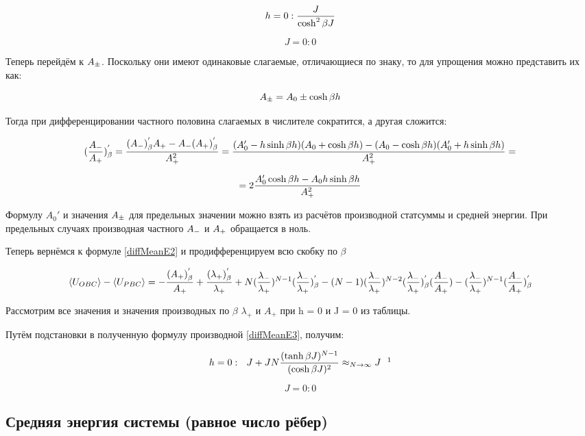 \[ h = 0: \frac{J}{\cosh^{2}\beta J} \]

\[ J = 0: 0 \]

Теперь перейдём к $A_{\pm}$. Поскольку они имеют одинаковые слагаемые, отличающиеся по знаку, то для упрощения можно представить их как:

\[ A_{\pm} = A_{0} \pm \cosh{\beta h} \]

Тогда при дифференцировании частного половина слагаемых в числителе сократится, а другая сложится:

\[ (\frac{A_{-}}{A_{+}})^{'}_{\beta} = \frac{(A_{-})^{'}_{\beta}A_{+}-A_{-}(A_{+})^{'}_{\beta}}{A_{+}^{2}} = \frac{(A_{0}' - h\sinh{\beta h})(A_{0} + \cosh{\beta h}) - (A_{0} - \cosh{\beta h})(A_{0}'+ h\sinh{\beta h})}{A_{+}^{2}} = \]

\[ = 2\frac{A_{0}'\cosh{\beta h} - A_{0}h\sinh{\beta h}}{A_{+}^{2}}\]

Формулу $A_{0}'$ и значения $A_{\pm}$ для предельных значении можно взять из расчётов производной статсуммы и средней энергии. При предельных случаях производная частного $A_{-}$ и $A_{+}$ обращается в ноль.

Теперь вернёмся к формуле \eqref{diffMeanE2} и продифференцируем всю скобку по $\beta$

\begin{equation}\label{diffMeanE3}
    \langle U_{OBC} \rangle - \langle U_{PBC} \rangle = -\frac{(A_{+})^{'}_{\beta}}{A_{+}} + \frac{(\lambda_{+})^{'}_{\beta}}{\lambda_{+}} + N(\frac{\lambda_{-}}{\lambda_{+}})^{N-1}(\frac{\lambda_{-}}{\lambda_{+}})^{'}_{\beta} - (N-1)(\frac{\lambda_{-}}{\lambda_{+}})^{N-2}(\frac{\lambda_{-}}{\lambda_{+}})^{'}_{\beta}(\frac{A_{-}}{A_{+}}) - (\frac{\lambda_{-}}{\lambda_{+}})^{N-1}(\frac{A_{-}}{A_{+}})^{'}_{\beta}
\end{equation}

Рассмотрим все значения и значения производных по $\beta$ $ \lambda_{+}$ и $A_{+}$ при h = 0 и J = 0 из таблицы.

Путём подстановки в полученную формулу производной \eqref{diffMeanE3}, получим:

\[ h = 0:\ \ J + JN\frac{(\tanh{\bj})^{N-1}}{(\cosh{\bj})^{2}} \approx_{N\to\infty} J\ \ \footnotemark\]

\[J = 0: 0\]


\subsection{Средняя энергия системы (равное число рёбер)}

